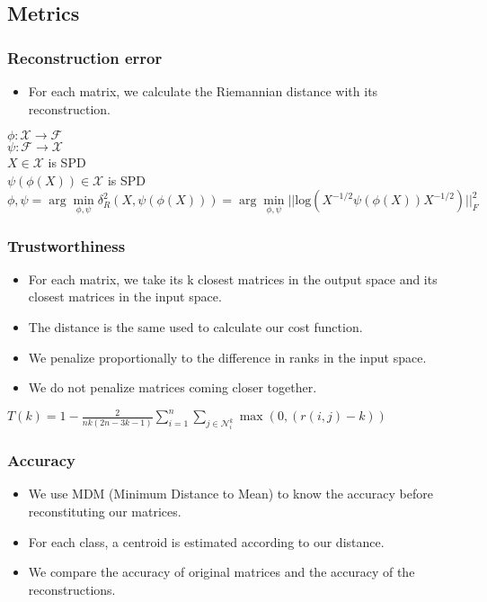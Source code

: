 \documentclass{beamer}
\begin{document}
\subsection{Metrics}
\begin{frame}
    \frametitle{Reconstruction error}
    \begin{itemize}
        \item For each matrix, we calculate the Riemannian distance with its reconstruction.
    \end{itemize}
    \begin{center}
        $ \phi : \mathcal{X} \rightarrow \mathcal{F}$ \\
        $ \psi : \mathcal{F} \rightarrow \mathcal{X}$ \\
        $ X \in \mathcal{X}$ is SPD \\
        $ \psi (\phi(X)) \in \mathcal{X}$ is SPD \\
        $ \phi,\psi = \arg\min\limits_{\phi,\psi} \delta^2_R(X,\psi (\phi(X))) =  \arg \min\limits_{\phi,\psi} ||\text{log}(X^{-1/2}\psi (\phi(X))X^{-1/2})||^2_F$
    \end{center}
    \end{frame}
\begin{frame}
\frametitle{Trustworthiness}
\begin{itemize}
    \item For each matrix, we take its k closest matrices in the output space and its closest matrices in the input space.
    \item The distance is the same used to calculate our cost function.
    \item We penalize proportionally to the difference in ranks in the input space.
    \item We do not penalize matrices coming closer together.
\end{itemize}
\begin{center}
    $ T(k) = 1 - \frac{2}{nk(2n-3k-1)} \sum\limits_{i=1}^n\sum\limits_{j\in\mathcal{N}_i^k} \max(0,(r(i,j)-k)) $
\end{center}
\end{frame}
\begin{frame}
\frametitle{Accuracy}
\begin{itemize}
    \item We use MDM (Minimum Distance to Mean) to know the accuracy before reconstituting our matrices.
    \item For each class, a centroid is estimated according to our distance.
    \item We compare the accuracy of original matrices and the accuracy of the reconstructions.
\end{itemize}
\end{frame}
\end{document}
